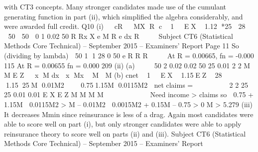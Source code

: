 with CT3 concepts. Many stronger candidates made use of the cumulant
generating function in part (ii), which simplified the algebra considerably, and
were awarded full credit.
Q10 (i)   cR   MX R
c  1 EX  1.12 *25  28 
  50  50 
0
1
0.02
50
R
Rx
X
e
M R e dx
R

  
Subject CT6 (Statistical Methods Core Technical) – September 2015 – Examiners’ Report
Page 11
So (dividing by lambda)
 50 1
1 28 0
50
e R
R
R

  
At R = 0.00665, fn = -0.000 115
At R = 0.00655 fn = 0.000 209
(ii) (a)    
50 2
0.02 0.02 50 25 0.01 2
2 M
M
E Z   x M dx  x Mx  M  M
(b) cnet  1 EX  1.15EZ
 28 1.1525M 0.01M2 
 0.751.15M 0.0115M2 
net claims =      
 
2
2
25 25 0.01
0.01
E X E Z M M
M M
     
  
Need income > claims so
 0.75 + 1.15M  0.0115M2 > M – 0.01M2
 0.0015M2 + 0.15M – 0.75 > 0
M > 5.279
(iii) It decreases Mmin since reinsurance is less of a drag.
Again most candidates were able to score well on part (i), but only stronger
candidates were able to apply reinsurance theory to score well on parts (ii)
and (iii).
Subject CT6 (Statistical Methods Core Technical) – September 2015 – Examiners’ Report
